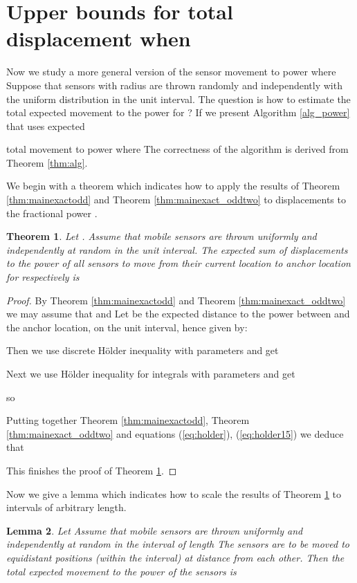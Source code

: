 \documentclass[final,5p,times,twocolumn]{elsarticle_mod}
\newtheorem{theorem}{Theorem}
\newtheorem{Lemma}[theorem]{Lemma}
\begin{document}
\section{Upper bounds for total displacement when }
\label{upper bounds:sec}
Now we study a more general version of the sensor movement to power  where 
Suppose that  sensors with radius  are thrown randomly and independently with the uniform distribution in the unit interval.
The question is how to estimate the  total expected movement  to the power  for ? 
If  we present Algorithm \ref{alg_power} that uses expected 

total movement to power  
where  The correctness of the algorithm is derived from Theorem \ref{thm:alg}.

We begin with a theorem which indicates how to apply the results of 
Theorem \ref{thm:mainexactodd}  and Theorem \ref{thm:mainexact_oddtwo}
to displacements to the fractional power .
\begin{theorem}
 \label{thm:fractional}
Let  . Assume that  mobile sensors are thrown uniformly and independently at random in the unit interval. The expected sum
of displacements to the power  of all sensors to move from their current location to anchor location 
for  respectively is 
\end{theorem}
\begin{proof}
By Theorem \ref{thm:mainexactodd} and Theorem \ref{thm:mainexact_oddtwo} we may assume that  and 
Let  be the expected distance to the power  between  and the  anchor location,  on the
unit interval, hence given by:

Then we use discrete H\"older inequality with parameters   
and get

Next we use H\"older inequality for integrals with parameters    and get

so 

Putting together Theorem \ref{thm:mainexactodd}, Theorem \ref{thm:mainexact_oddtwo}
and equations (\ref{eq:holder}), (\ref{eq:holder15}) we deduce that

This finishes the proof of Theorem \ref{thm:fractional}. 
\end{proof}
Now we give a lemma which indicates how to scale the results of Theorem \ref{thm:fractional}
to intervals of arbitrary length.
\begin{Lemma}
\label{lem:scale}
Let  Assume that  mobile sensors are thrown uniformly and independently at random in the interval of length  The sensors are to be moved to
equidistant positions (within the interval) at distance  from each other. Then the total expected movement to the power  of the sensors
is 
\end{Lemma}
\end{document}

